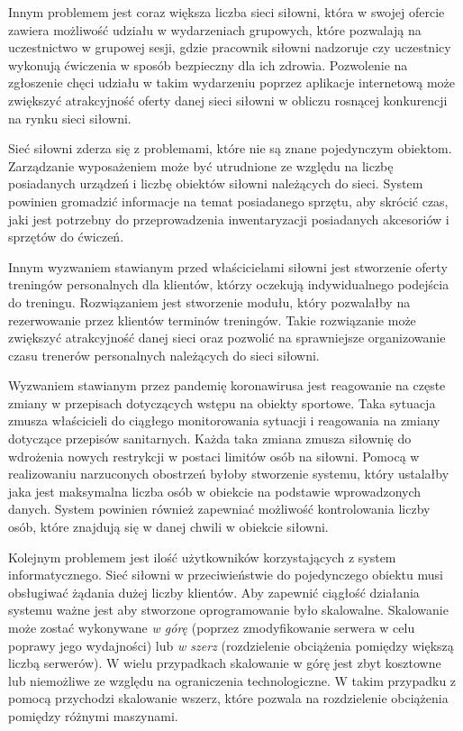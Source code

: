 \documentclass[a4paper,twoside,12pt]{book}
\begin{document}
Innym problemem jest coraz większa liczba sieci siłowni, która w swojej ofercie zawiera możliwość udziału w wydarzeniach grupowych, które pozwalają na uczestnictwo w grupowej sesji, gdzie pracownik siłowni nadzoruje czy uczestnicy wykonują ćwiczenia w sposób bezpieczny dla ich zdrowia. Pozwolenie na zgłoszenie chęci udziału w takim wydarzeniu poprzez aplikacje internetową może zwiększyć atrakcyjność oferty danej sieci siłowni w obliczu rosnącej konkurencji na rynku sieci siłowni.

Sieć siłowni zderza się z problemami, które nie są znane pojedynczym obiektom. Zarządzanie wyposażeniem może być utrudnione ze względu na liczbę posiadanych urządzeń i liczbę obiektów siłowni należących do sieci. System powinien gromadzić informacje na temat posiadanego sprzętu, aby skrócić czas, jaki jest potrzebny do przeprowadzenia inwentaryzacji posiadanych akcesoriów i sprzętów do ćwiczeń.

Innym wyzwaniem stawianym przed właścicielami siłowni jest stworzenie oferty treningów personalnych dla klientów, którzy oczekują indywidualnego podejścia do treningu. Rozwiązaniem jest stworzenie modułu, który pozwalałby na rezerwowanie przez klientów terminów treningów. Takie rozwiązanie może zwiększyć atrakcyjność danej sieci oraz pozwolić na sprawniejsze organizowanie czasu trenerów personalnych należących do sieci siłowni.

Wyzwaniem stawianym przez pandemię koronawirusa jest reagowanie na częste zmiany w przepisach dotyczących wstępu na obiekty sportowe. Taka sytuacja zmusza właścicieli do ciągłego monitorowania sytuacji i reagowania na zmiany dotyczące przepisów sanitarnych. Każda taka zmiana zmusza siłownię do wdrożenia nowych restrykcji w postaci limitów osób na siłowni. Pomocą w realizowaniu narzuconych obostrzeń byłoby stworzenie systemu, który ustalałby jaka jest maksymalna liczba osób w obiekcie na podstawie wprowadzonych danych. System powinien również zapewniać możliwość kontrolowania liczby osób, które znajdują się w danej chwili w obiekcie siłowni.

Kolejnym problemem jest ilość użytkowników korzystających z system informatycznego. Sieć siłowni w przeciwieństwie do pojedynczego obiektu musi obsługiwać żądania dużej liczby klientów. Aby zapewnić ciągłość działania systemu ważne jest aby stworzone oprogramowanie było skalowalne. Skalowanie może zostać wykonywane \textit{w górę} (poprzez zmodyfikowanie serwera w celu poprawy jego wydajności) lub \textit{w szerz} (rozdzielenie obciążenia pomiędzy większą liczbą serwerów)\cite{bib:mongodb_guide}. W wielu przypadkach skalowanie w górę jest zbyt kosztowne lub niemożliwe ze względu na ograniczenia technologiczne. W takim przypadku z pomocą przychodzi skalowanie wszerz, które pozwala na rozdzielenie obciążenia pomiędzy różnymi maszynami.
\end{document}
